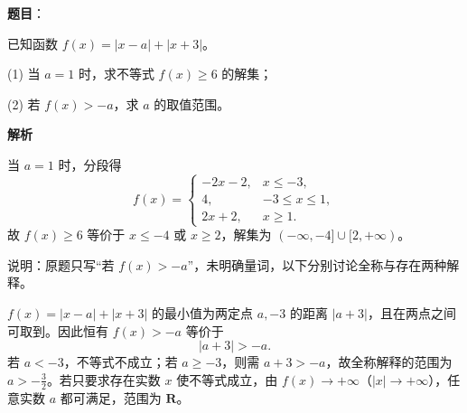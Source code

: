 \begin{answer}

\textbf{题目}：

已知函数 $f(x)=|x-a|+|x+3|$。

(1) 当 $a=1$ 时，求不等式 $f(x)\geqslant6$ 的解集；

(2) 若 $f(x)>-a$，求 $a$ 的取值范围。

\makeatletter{}\ifx\@currenvir\gkanswerblock\else\clearpage\fi\makeatother

\textbf{解析}


当 $a=1$ 时，分段得
\nopagebreak[4]
\[
f(x)=
\begin{cases}
-2x-2,&x\leqslant-3,\\
4,&-3\leqslant x\leqslant1,\\
2x+2,&x\geqslant1.
\end{cases}
\]
故 $f(x)\geqslant6$ 等价于 $x\leqslant-4$ 或 $x\geqslant2$，解集为 $(-\infty,-4]\cup[2,+\infty)$。


说明：原题只写“若 $f(x)>-a$”，未明确量词，以下分别讨论全称与存在两种解释。

$f(x)=|x-a|+|x+3|$ 的最小值为两定点 $a,-3$ 的距离 $|a+3|$，且在两点之间可取到。因此恒有 $f(x)>-a$ 等价于
\nopagebreak[4]
\[
|a+3|>-a.
\]
若 $a<-3$，不等式不成立；若 $a\geqslant-3$，则需 $a+3>-a$，故全称解释的范围为 $a>-\frac32$。若只要求存在实数 $x$ 使不等式成立，由 $f(x)\to+\infty$（$|x|\to+\infty$），任意实数 $a$ 都可满足，范围为 $\mathbf R$。

\gkanswer{答案（1）：$(-\infty,-4]\cup[2,+\infty)$}


\end{answer}